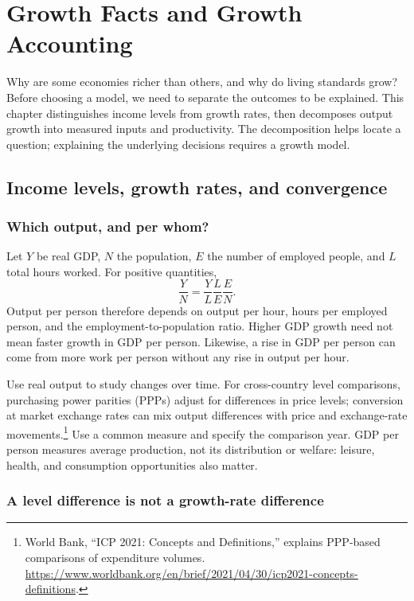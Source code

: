 \section{Growth Facts and Growth Accounting}\label{sec:growth-facts}

Why are some economies richer than others, and why do living standards grow?
Before choosing a model, we need to separate the outcomes to be explained.
This chapter distinguishes income levels from growth rates, then decomposes
output growth into measured inputs and productivity. The decomposition helps
locate a question; explaining the underlying decisions requires a growth model.

\subsection{Income levels, growth rates, and convergence}

\subsubsection{Which output, and per whom?}

Let $Y$ be real GDP, $N$ the population, $E$ the number of employed people,
and $L$ total hours worked. For positive quantities,
\begin{equation}\label{eq:facts-income-identity}
\frac{Y}{N}=\frac{Y}{L}\frac{L}{E}\frac{E}{N}.
\end{equation}
Output per person therefore depends on output per hour, hours per employed
person, and the employment-to-population ratio. Higher GDP growth need not
mean faster growth in GDP per person. Likewise, a rise in GDP per person can
come from more work per person without any rise in output per hour.

Use real output to study changes over time. For cross-country level comparisons,
purchasing power parities (PPPs) adjust for differences in price levels;
conversion at market exchange rates can mix output differences with price and
exchange-rate movements.\footnote{World Bank, ``ICP 2021: Concepts and
Definitions,'' explains PPP-based comparisons of expenditure volumes.
\url{https://www.worldbank.org/en/brief/2021/04/30/icp2021-concepts-definitions}.}
Use a common measure and specify the comparison year. GDP per person measures
average production, not its distribution or welfare: leisure, health, and
consumption opportunities also matter.

\subsubsection{A level difference is not a growth-rate difference}

